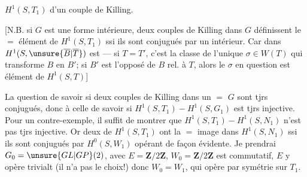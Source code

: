 $H^1(S,T_1)$  d'un couple de Killing.

[N.B. si $G$ est une forme intérieure,  deux couples de Killing  dans $G$ définissent le $=$ élément de $H^1(S,T_1)$ ssi ils sont conjugués par un  intérieur. Car   dans $H^1(S,\unsure{\overline B|\overline T})$ est  --- si $T=T'$, c'est la classe  de l'unique $\sigma\in W(T)$ qui transforme $B$ en $B'$; si $B'$ est l'opposé de $B$ rel. à $T$, alors le $\sigma$ en question est   élément  de $H^1(S,T)$]


La question de savoir si deux couples de Killing dans un $=$ $G$ sont tjrs conjugués,  donc à celle de savoir si $H^1(S,T_1)\mathbin{-}H^1(S,G_1)$ est tjrs injective. Pour un contre-exemple, il suffit de montrer que $H^1(S,T_1)\mathbin{-}H^1(S,N_1)$ n'est pas tjrs injective. Or deux  de $H^1(S,T_1)$ ont la $=$ image dans $H^1(S,N_1)$ ssi ils sont conjugués par $H^0(S,W_1)$ opérant de façon évidente. Je prendrai  $G_0=\unsure{GL|GP}(2)$, avec $E=\mathbf Z/2\mathbf Z$, $W_0=\mathbf Z/2\mathbf Z$ est commutatif,  $E$ y opère trivialt (il n'a pas le choix!) donc $W_0=W_1$, qui opère par symétrie sur $T_1$.
